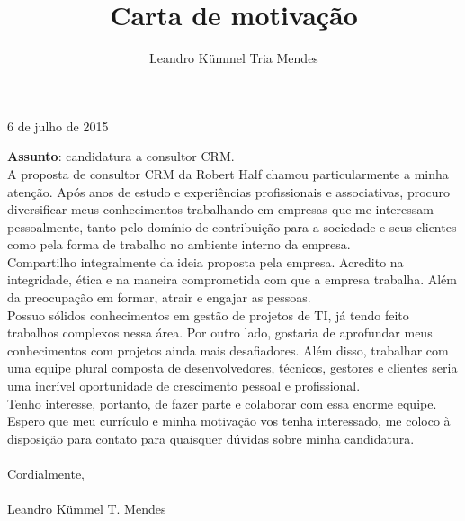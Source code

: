 \documentclass[a4paper,10pt]{article}
\title{Carta de motivação}
\author{Leandro Kümmel Tria Mendes}
\begin{document}
\begin{flushright} 
6 de julho de 2015
\end{flushright}
\textbf{Assunto}: candidatura a consultor CRM.\\

   A proposta de consultor CRM da Robert Half chamou particularmente a minha atenção. Após anos de estudo e
experiências profissionais e associativas, procuro diversificar meus conhecimentos trabalhando em empresas que me interessam pessoalmente, 
tanto pelo domínio de contribuição para a sociedade e seus clientes 
como pela forma de trabalho no ambiente interno da empresa.\\

Compartilho integralmente da ideia proposta pela empresa. Acredito na
integridade, ética e na maneira comprometida com que a empresa trabalha.
Além da preocupação em formar, atrair e engajar as pessoas.\\

Possuo sólidos conhecimentos em gestão de projetos de TI, já tendo feito trabalhos complexos 
nessa área. Por outro lado, gostaria de aprofundar meus conhecimentos com projetos ainda mais desafiadores.
Além disso, trabalhar com uma equipe plural composta de
desenvolvedores, técnicos, gestores e clientes seria uma incrível oportunidade
de crescimento pessoal e profissional.\\

Tenho interesse, portanto, de fazer parte e colaborar com essa enorme equipe.
Espero que meu currículo e minha motivação vos tenha interessado, me
coloco à disposição para contato para quaisquer dúvidas sobre minha
candidatura.\\
\\
Cordialmente,\\
\\
Leandro Kümmel T. Mendes
\end{document}
